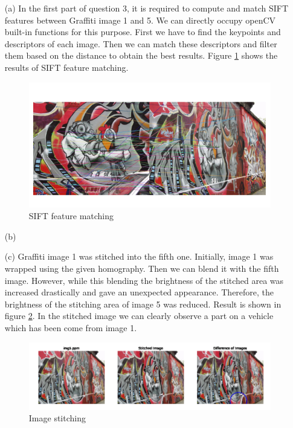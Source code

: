 \documentclass[11pt]{article}
\begin{document}
\begin{itemize}
    \item[(a)] In the first part of question 3, it is required to compute and match SIFT features between Graffiti image 1 and 5.
    We can directly occupy openCV built-in functions for this purpose. First we have to find the keypoints and descriptors of each image. Then we
    can match these descriptors and filter them based on the distance to obtain the best results. Figure \ref{SIFT feature matching} shows the 
    results of SIFT feature matching.

    \begin{figure}
        \centering
        \includegraphics[width=\textwidth]{Images/31.png}
        \caption{SIFT feature matching}
        \label{SIFT feature matching}
    \end{figure}

    \item[(b)]
    \item[(c)] Graffiti image 1 was stitched into the fifth one. Initially, image 1 was wrapped using the given homography. Then we can blend it 
    with the fifth image. However, while this blending the brightness of the stitched area was increased drastically and gave an unexpected appearance.
    Therefore, the brightness of the stitching area of image 5 was reduced. Result is shown in figure \ref{Image stitching}. In the stitched image 
    we can clearly observe a part on a vehicle which has been come from image 1. 
    
    \begin{figure}
        \centering
        \includegraphics[width=\textwidth]{Images/33.png}
        \caption{Image stitching}
        \label{Image stitching}
    \end{figure}
      
\end{itemize}

%
%
\end{document}

